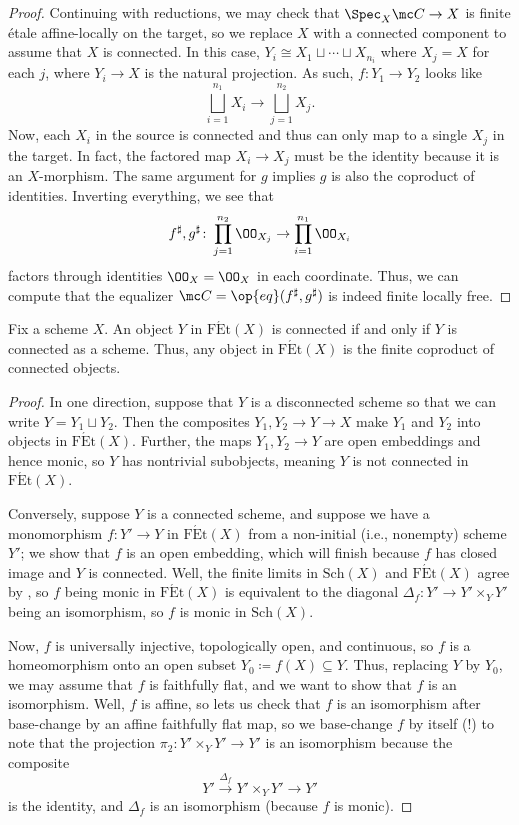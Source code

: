 \documentclass{amsart}
\begin{document}
\begin{proof}
    Continuing with reductions, we may check that $\Spec_X\mc C\to X$ is finite \'etale affine-locally on the target, so we replace $X$ with a connected component to assume that $X$ is connected. In this case, $Y_i\cong X_1\sqcup\cdots\sqcup X_{n_i}$ where $X_j=X$ for each $j$, where $Y_i\to X$ is the natural projection. As such, $f\colon Y_1\to Y_2$ looks like
    \[\bigsqcup_{i=1}^{n_1}X_i\to\bigsqcup_{j=1}^{n_2}X_j.\]
    Now, each $X_i$ in the source is connected and thus can only map to a single $X_j$ in the target. In fact, the factored map $X_i\to X_j$ must be the identity because it is an $X$-morphism. The same argument for $g$ implies $g$ is also the coproduct of identities. Inverting everything, we see that
    \[f^\sharp,g^\sharp\colon\prod_{j=1}^{n_2}\OO_{X_j}\to\prod_{i=1}^{n_1}\OO_{X_i}\]
    factors through identities $\OO_X=\OO_X$ in each coordinate. Thus, we can compute that the equalizer $\mc C=\op{eq}(f^\sharp,g^\sharp)$ is indeed finite locally free.
\end{proof}
\begin{lemma} \label{lem:fin-et-connected}
    Fix a scheme $X$. An object $Y$ in $\mathrm{F\acute Et}(X)$ is connected if and only if $Y$ is connected as a scheme. Thus, any object in $\mathrm{F\acute Et}(X)$ is the finite coproduct of connected objects.
\end{lemma}
\begin{proof}
    In one direction, suppose that $Y$ is a disconnected scheme so that we can write $Y=Y_1\sqcup Y_2$. Then the composites $Y_1,Y_2\to Y\to X$ make $Y_1$ and $Y_2$ into objects in $\mathrm{F\acute Et}(X)$. Further, the maps $Y_1,Y_2\to Y$ are open embeddings and hence monic, so $Y$ has nontrivial subobjects, meaning $Y$ is not connected in $\mathrm{F\acute Et}(X)$.

    Conversely, suppose $Y$ is a connected scheme, and suppose we have a monomorphism $f\colon Y'\to Y$ in $\mathrm{F\acute Et}(X)$ from a non-initial (i.e., nonempty) scheme $Y'$; we show that $f$ is an open embedding, which will finish because $f$ has closed image and $Y$ is connected. Well, the finite limits in $\mathrm{Sch}(X)$ and $\mathrm{F\acute Et}(X)$ agree by , so $f$ being monic in $\mathrm{F\acute Et}(X)$ is equivalent to the diagonal $\Delta_f\colon Y'\to Y'\times_YY'$ being an isomorphism, so $f$ is monic in $\mathrm{Sch}(X)$.

    Now, $f$ is universally injective, topologically open, and continuous, so $f$ is a homeomorphism onto an open subset $Y_0\coloneqq f(X)\subseteq Y$. Thus, replacing $Y$ by $Y_0$, we may assume that $f$ is faithfully flat, and we want to show that $f$ is an isomorphism. Well, $f$ is affine, so  lets us check that $f$ is an isomorphism after base-change by an affine faithfully flat map, so we base-change $f$ by itself (!) to note that the projection $\pi_2\colon Y'\times_YY'\to Y'$ is an isomorphism because the composite
    \[Y'\stackrel{\Delta_f}\to Y'\times_YY'\to Y'\]
    is the identity, and $\Delta_f$ is an isomorphism (because $f$ is monic).
\end{proof}
\end{document}
